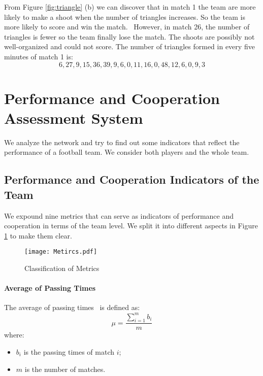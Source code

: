 \documentclass[12pt]{mcmthesis}
\begin{document}
From Figure \ref{fig:triangle} (b) we can discover that in match 1 the team are more likely to make a shoot when the number of triangles increases. So the team is more likely to score and win the match.~\cite{common} However, in match 26, the number of triangles is fewer so the team finally lose the match. The shoots are possibly not well-organized and could not score. The number of triangles formed in every five minutes of match 1 is:\[6, 27, 9, 15, 36, 39, 9, 6, 0, 11, 16, 0, 48, 12, 6, 0, 9, 3\] %
\section{Performance and Cooperation Assessment System}
	We analyze the network and try to find out some indicators that reflect the performance of a football team. We consider both players and the whole team.
	
\subsection{Performance and Cooperation Indicators of the Team}
	We expound nine metrics that can serve as indicators of performance and cooperation in terms of the team level. We split it into different aspects in Figure \ref{fig:metrics} to make them clear.
\begin{figure}
	\centering
	\texttt{[image: Metircs.pdf]}
	\caption{Classification of Metrics}
	\label{fig:metrics}
\end{figure}
	\paragraph{Average of Passing Times}
	The average of passing times~\cite{harsh} is defined as:
	\begin{equation}\label{eq:average}
		\mu = \frac{\sum_{i = 1}^{m} b_i}{m}
	\end{equation}
	where:
	\begin{itemize}
		\item $b_i$ is the passing times of match $i$;
		\item $m$ is the number of matches.
	\end{itemize}
	
\end{document}
